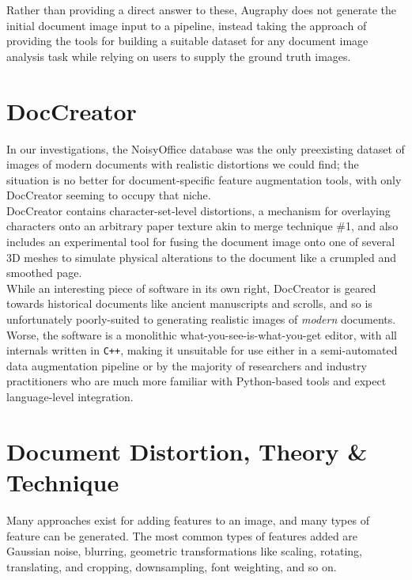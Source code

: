 \documentclass[runningheads]{llncs}
\begin{document}
Rather than providing a direct answer to these, Augraphy does not generate the initial document image input to a pipeline, instead taking the approach of providing the tools for building a suitable dataset for any document image analysis task while relying on users to supply the ground truth images.

\section{DocCreator}
In our investigations, the NoisyOffice database was the only preexisting dataset of images of modern documents with realistic distortions we could find; the situation is no better for document-specific feature augmentation tools, with only DocCreator \cite{ref_DocCreator} seeming to occupy that niche.\\

DocCreator contains character-set-level distortions, a mechanism for overlaying characters onto an arbitrary paper texture akin to merge technique \#1, and also includes an experimental tool for fusing the document image onto one of several 3D meshes to simulate physical alterations to the document like a crumpled and smoothed page.\\

While an interesting piece of software in its own right, DocCreator is geared towards historical documents like ancient manuscripts and scrolls, and so is unfortunately poorly-suited to generating realistic images of \textit{modern} documents. Worse, the software is a monolithic what-you-see-is-what-you-get editor, with all internals written in \texttt{C++}, making it unsuitable for use either in a semi-automated data augmentation pipeline or by the majority of researchers and industry practitioners who are much more familiar with Python-based tools and expect language-level integration.

\section{Document Distortion, Theory \& Technique}
Many approaches exist for adding features to an image, and many types of feature can be generated. The most common types of features added are Gaussian noise, blurring, geometric transformations like scaling, rotating, translating, and cropping, downsampling, font weighting, and so on.\\
\end{document}
